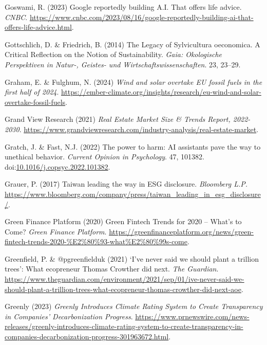 \documentclass[
  letterpaper,
  DIV=11,
  numbers=noendperiod]{scrartcl}
\newlength{\cslhangindent}
\newenvironment{CSLReferences}[2] %
 {\begin{list}{}{%
  \setlength{\itemindent}{0pt}
  \setlength{\leftmargin}{0pt}
  \setlength{\parsep}{0pt}
  \ifodd #1
   \setlength{\leftmargin}{\cslhangindent}
   \setlength{\itemindent}{-1\cslhangindent}
  \fi
  \setlength{\itemsep}{#2\baselineskip}}}
 {\end{list}}
\begin{document}
\begin{CSLReferences}{0}{1}
Goswami, R. (2023) Google reportedly building {A}.{I}. That offers life
advice. \emph{CNBC}.
\url{https://www.cnbc.com/2023/08/16/google-reportedly-building-ai-that-offers-life-advice.html}.

Gottschlich, D. \& Friedrich, B. (2014) The {Legacy} of {Sylvicultura}
oeconomica. {A Critical Reflection} on the {Notion} of {Sustainability}.
\emph{Gaia: Okologische Perspektiven in Natur-, Geistes- und
Wirtschaftswissenschaften}. 23, 23--29.

Graham, E. \& Fulghum, N. (2024) \emph{Wind and solar overtake {EU}
fossil fuels in the first half of 2024}.
\url{https://ember-climate.org/insights/research/eu-wind-and-solar-overtake-fossil-fuels}.

Grand View Research (2021) \emph{Real {Estate Market Size} \& {Trends
Report}, 2022-2030}.
\url{https://www.grandviewresearch.com/industry-analysis/real-estate-market}.

Gratch, J. \& Fast, N.J. (2022) The power to harm: {AI} assistants pave
the way to unethical behavior. \emph{Current Opinion in Psychology}. 47,
101382.
doi:\href{https://doi.org/10.1016/j.copsyc.2022.101382}{10.1016/j.copsyc.2022.101382}.

Grauer, P. (2017) Taiwan leading the way in {ESG} disclosure.
\emph{Bloomberg L.P.}
\url{https://www.bloomberg.com/company/press/taiwan_leading_in_esg_disclosure/}.

Green Finance Platform (2020) Green {Fintech Trends} for 2020 --
{What}'s to {Come}? \emph{Green Finance Platform}.
\url{https://greenfinanceplatform.org/news/green-fintech-trends-2020-\%E2\%80\%93-what\%E2\%80\%99s-come}.

Greenfield, P. \& @pgreenfielduk (2021) {`{I}'ve never said we should
plant a trillion trees'}: What ecopreneur {Thomas Crowther} did next.
\emph{The Guardian}.
\url{https://www.theguardian.com/environment/2021/sep/01/ive-never-said-we-should-plant-a-trillion-trees-what-ecopreneur-thomas-crowther-did-next-aoe}.

Greenly (2023) \emph{Greenly {Introduces Climate Rating System} to
{Create Transparency} in {Companies}' {Decarbonization Progress}}.
\url{https://www.prnewswire.com/news-releases/greenly-introduces-climate-rating-system-to-create-transparency-in-companies-decarbonization-progress-301963672.html}.


\end{CSLReferences}
\end{document}

